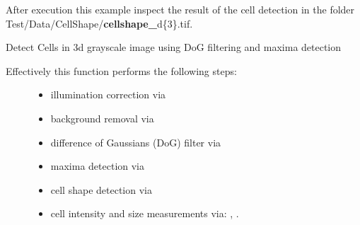 \documentclass[letterpaper,10pt,english]{sphinxmanual}
\begin{document}
After execution this example inspect the result of the cell detection in
the folder Test/Data/CellShape/{\color{red}\bfseries{}cellshape\_}d\{3\}.tif.

\begin{fulllineitems}
\label{api/ClearMap.ImageProcessing:ClearMap.ImageProcessing.SpotDetection.detectSpots}
Detect Cells in 3d grayscale image using DoG filtering and maxima detection
\begin{description}
\item[{Effectively this function performs the following steps:}] \leavevmode\begin{itemize}
\item {} 
illumination correction via {\hyperref[api/ClearMap.ImageProcessing:ClearMap.ImageProcessing.IlluminationCorrection.correctIllumination]{\emph{}}}

\item {} 
background removal via {\hyperref[api/ClearMap.ImageProcessing:ClearMap.ImageProcessing.BackgroundRemoval.removeBackground]{\emph{}}}

\item {} 
difference of Gaussians (DoG) filter via 

\item {} 
maxima detection via {\hyperref[api/ClearMap.ImageProcessing:ClearMap.ImageProcessing.MaximaDetection.findExtendedMaxima]{\emph{}}}

\item {} 
cell shape detection via {\hyperref[api/ClearMap.ImageProcessing:ClearMap.ImageProcessing.CellSizeDetection.detectCellShape]{\emph{}}}

\item {} 
cell intensity and size measurements via: {\hyperref[api/ClearMap.ImageProcessing:ClearMap.ImageProcessing.CellSizeDetection.findCellIntensity]{\emph{}}},
{\hyperref[api/ClearMap.ImageProcessing:ClearMap.ImageProcessing.CellSizeDetection.findCellSize]{\emph{}}}.


\end{itemize}
\end{description}
\end{fulllineitems}
\end{document}
